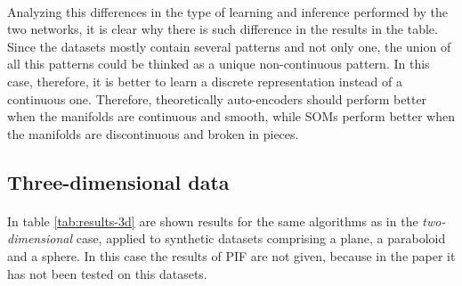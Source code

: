 \paragraph{}
Analyzing this differences in the type of learning and inference performed by the two networks, it is clear why there is such difference in the results in the table. Since the datasets mostly contain several patterns and not only one, the union of all this patterns could be thinked as a unique non-continuous pattern. In this case, therefore, it is better to learn a discrete representation instead of a continuous one. Therefore, theoretically auto-encoders should perform better when the manifolds are continuous and smooth, while SOMs perform better when the manifolds are discontinuous and broken in pieces.

\subsection{Three-dimensional data}
\paragraph{}
In table \ref{tab:results-3d} are shown results for the same algorithms as in the \textit{two-dimensional} case, applied to synthetic datasets comprising a plane, a paraboloid and a sphere. In this case the results of PIF are not given, because in the paper it has not been tested on this datasets.

\begin{table}[h]
    \centering
    \caption{Results on synthetic 3D datasets. Results in bold are the maximum value along the row.}
    \label{tab:results-3d}
\end{table}

